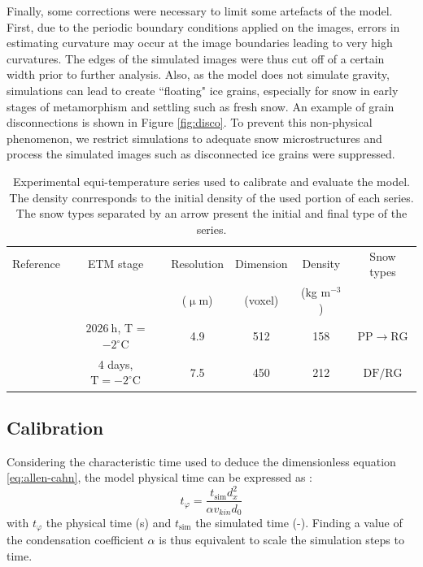\documentclass[draft,ms]{agujournal2019}
\begin{document}
Finally, some corrections were necessary to limit some artefacts of the model. First, due to the periodic boundary conditions applied on the images, errors in estimating curvature may occur at the image boundaries leading to very high curvatures. The edges of the simulated images were thus cut off of a certain width prior to further analysis. Also, as the model does not simulate gravity, simulations can lead to create ``floating" ice grains,  especially for snow in early stages of metamorphism and settling such as fresh snow. An example of grain disconnections is shown in Figure \ref{fig:disco}. To prevent this non-physical phenomenon, we restrict simulations to adequate snow microstructures and process the simulated images such as disconnected ice grains were suppressed. 





\begin{table}
\hspace*{-0.5cm}
\begin{tabular}{|c|c|c|c|c|c|}
\hline Reference & ETM stage & Resolution & Dimension & Density & Snow types \\
 &  & ($\upmu$m) &(voxel) & (kg m$^{-3}$) &  \\
\hline 
\cite{flin_three-dimensional_2004} & $2026\ \mathrm{h}$, T = $-2^{\circ} \mathrm{C}$ & 4.9 & 512 & 158 & \small{$\mathrm{PP} \rightarrow \mathrm{RG}$} \\
\cite{hagenmuller_motion_2019} & 4 days, $\mathrm{T}=-2^{\circ} \mathrm{C}$ & 7.5 & 450 & 212 & \small{$\mathrm{DF/RG}$} \\
\hline
\end{tabular}
\caption{Experimental equi-temperature series used to calibrate and evaluate the model. The density conrresponds to the initial density of the used portion of each series. The snow types separated by an arrow present the initial and final type of the series.}
\label{tab:series_exp}
\end{table}

\subsection{Calibration} 
\label{subsec:calib}

Considering the characteristic time used to deduce the dimensionless equation \eqref{eq:allen-cahn}, the model physical time can be expressed as \cite{bretin_and_denis_discrete-continuous_2015}: 
\begin{equation}\label{equ:alpha}
   t_\varphi = \frac{t_{\text{sim}} d_x^2}{\alpha v_{kin} d_0}
\end{equation}
with $t_{\varphi}$ the physical time (s) and $t_{\text{sim}}$ the simulated time (-). Finding a value of the condensation coefficient $\alpha$ is thus equivalent to scale the simulation steps to time.
\end{document}
